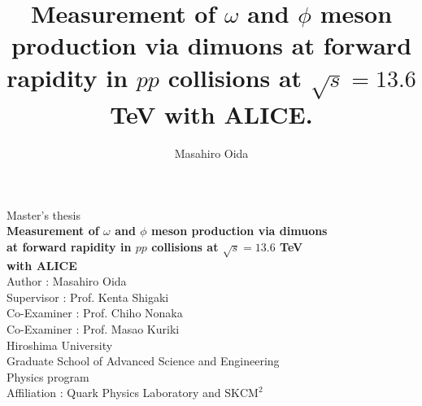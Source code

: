 \documentclass[11pt,a4paper,titlepage]{article}
\title{Measurement of $\omega$ and $\phi$ meson production via dimuons at forward rapidity in $pp$ collisions at $\sqrt{s}=13.6$ TeV with ALICE.}
\author{Masahiro Oida}
\date{}
\begin{document}
  \setlength{\headheight}{18.0pt}
  \addtolength{\topmargin}{-4.0pt}
  \setlength{\baselineskip}{1.2\baselineskip}
  \begin{titlepage}
    \centering  %
    \vspace*{30mm} %

    {\LARGE Master's thesis} \\[20mm] %
    
    {\LARGE \textbf{Measurement of $\omega$ and $\phi$ meson production via dimuons\\ at forward rapidity in $pp$ collisions at $\sqrt{s}=13.6$ TeV \\ with ALICE}} \\[50mm] %
  


    {\Large Author : Masahiro Oida} \\[10mm]
    {\Large Supervisor  : Prof. Kenta Shigaki} \\[5mm] %
    {\Large Co-Examiner : Prof. Chiho Nonaka} \\[5mm] %
    {\Large Co-Examiner : Prof. Masao Kuriki} \\[5mm] %

    {\large Hiroshima University \\
    Graduate School of Advanced Science and Engineering \\
    Physics program}\\[10mm]
    {\large Affiliation : Quark Physics Laboratory and $\mathrm{SKCM^2}$} \\[5mm]

  \end{titlepage}

    \setcounter{tocdepth}{3}
    \tableofcontents
    \newpage
    \setcounter{section}{0}
    
    
    
    
    
    
    \newpage
    \begin{thebibliography}{99}
      
    \end{thebibliography}
\end{document}
